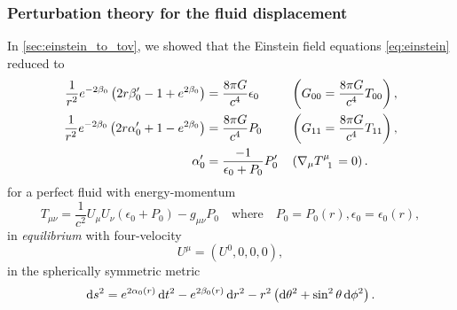 \subsubsection{Perturbation theory for the fluid displacement}

In \cref{sec:einstein_to_tov}, we showed that the Einstein field equations \eqref{eq:einstein} reduced to
\begin{subequations}%
\begin{align}%
	\frac{1}{r^2} e^{-2 \beta_0} \left( 2 r \beta_0' - 1 + e^{2 \beta_0} \right)  &= \frac{8 \pi G}{c^4} \epsilon_0   && \left( G_{00} = \frac{8 \pi G}{c^4} T_{00} \right) , \label{eq:nstars:field_equations_equilibrium_00} \\
	\frac{1}{r^2} e^{-2 \beta_0} \left( 2 r \alpha_0' + 1 - e^{2 \beta_0} \right) &= \frac{8 \pi G}{c^4} P_0          && \left( G_{11} = \frac{8 \pi G}{c^4} T_{11} \right) , \label{eq:nstars:field_equations_equilibrium_11} \\
	\alpha_0'                                                                     &= \frac{-1}{\epsilon_0 + P_0} P_0' && \left( \nabla_\mu T\indices{^\mu_1} = 0 \right)    . \label{eq:nstars:field_equations_equilibrium_T}
\end{align}%
\label{eq:nstars:field_equations_equilibrium}%
\end{subequations}%
for a perfect fluid with energy-momentum
\begin{equation}
	T_{\mu \nu} = \frac{1}{c^2} U_\mu U_\nu (\epsilon_0 + P_0) - g_{\mu \nu} P_0
	\quad \text{where} \quad
	P_0 = P_0(r), \epsilon_0 = \epsilon_0(r) ,
\label{eq:nstars:energy_momentum}
\end{equation}
in \emph{equilibrium} with four-velocity
\begin{equation}
	U^\mu = (U^0, 0,0,0) ,
\label{eq:nstars:velocity_equilibrium}
\end{equation}
in the spherically symmetric metric
\begin{equation}
	\mathop{}\!\mathrm{d} s^2 = e^{2 \alpha_0(r)} \mathop{}\!\mathrm{d} t^2 - e^{2 \beta_0(r)} \mathop{}\!\mathrm{d} r^2 - r^2 \left( \mathop{}\!\mathrm{d} \theta^2 + \sin^2 \theta \mathop{}\!\mathrm{d} \phi^2 \right) .
\end{equation}

